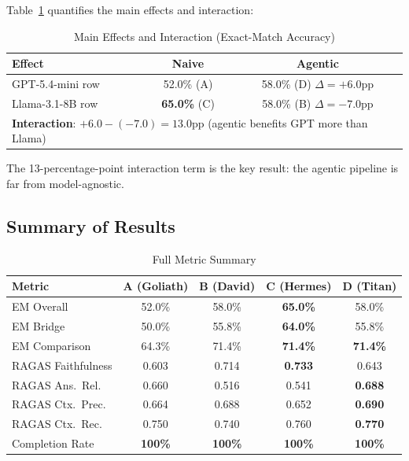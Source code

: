 \documentclass[12pt]{article}
\begin{document}
Table~\ref{tab:interaction} quantifies the main effects and interaction:

\begin{table}[H]
\centering
\caption{Main Effects and Interaction (Exact-Match Accuracy)}
\label{tab:interaction}
\begin{tabular}{lcc}
\toprule
\textbf{Effect} & \textbf{Naive} & \textbf{Agentic} \\
\midrule
GPT-5.4-mini row & 52.0\% (A) & 58.0\% (D) \quad $\Delta = +6.0$pp \\
Llama-3.1-8B row & \textbf{65.0\%} (C) & 58.0\% (B) \quad $\Delta = -7.0$pp \\
\midrule
\multicolumn{3}{l}{\textbf{Interaction}: $+6.0 - (-7.0) = 13.0$pp
  \quad (agentic benefits GPT more than Llama)} \\
\bottomrule
\end{tabular}
\end{table}

The 13-percentage-point interaction term is the key result: the agentic
pipeline is far from model-agnostic.

\subsection{Summary of Results}

\begin{table}[H]
\centering
\caption{Full Metric Summary}
\label{tab:summary}
\begin{tabular}{lcccc}
\toprule
\textbf{Metric} & \textbf{A (Goliath)} & \textbf{B (David)} &
\textbf{C (Hermes)} & \textbf{D (Titan)} \\
\midrule
EM Overall          & 52.0\% & 58.0\% & \textcolor{wingreen}{\textbf{65.0\%}} & 58.0\% \\
EM Bridge           & 50.0\% & 55.8\% & \textcolor{wingreen}{\textbf{64.0\%}} & 55.8\% \\
EM Comparison       & 64.3\% & 71.4\% & \textcolor{wingreen}{\textbf{71.4\%}} & \textcolor{wingreen}{\textbf{71.4\%}} \\
RAGAS Faithfulness  & 0.603  & 0.714  & \textcolor{wingreen}{\textbf{0.733}} & 0.643 \\
RAGAS Ans.\ Rel.    & 0.660  & 0.516  & 0.541 & \textcolor{wingreen}{\textbf{0.688}} \\
RAGAS Ctx.\ Prec.   & 0.664  & 0.688  & 0.652 & \textcolor{wingreen}{\textbf{0.690}} \\
RAGAS Ctx.\ Rec.    & 0.750  & 0.740  & 0.760 & \textcolor{wingreen}{\textbf{0.770}} \\
Completion Rate     & \textcolor{wingreen}{\textbf{100\%}} &
                      \textcolor{wingreen}{\textbf{100\%}} &
                      \textcolor{wingreen}{\textbf{100\%}} &
                      \textcolor{wingreen}{\textbf{100\%}} \\
\bottomrule
\end{tabular}
\end{table}
\end{document}
